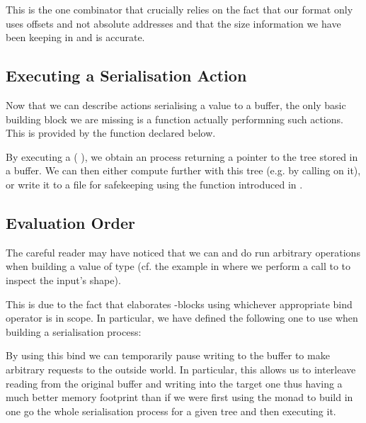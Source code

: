 This is the one combinator that crucially relies on the fact that our format
only uses offsets and not absolute addresses
and that the size information we have been keeping in  and
 is accurate.

\subsection{Executing a Serialisation Action}

Now that we can describe actions serialising a value to a buffer,
the only basic building block we are missing is a function actually
performning such actions.
%
This is provided by the  function
declared below.


By executing a (  ), we
obtain an  process returning a pointer to the tree 
stored in a buffer.
%
We can then either compute further with this tree (e.g. by calling
 on it), or write it to a file for safekeeping
using the function 
introduced in .

\subsection{Evaluation Order}

The careful reader may have noticed that we can and do run arbitrary 
operations when building a value of type 
(cf. the  example in  where we perform
a call to  to inspect the input's shape).

This is due to the fact that \idris{} elaborates -blocks using
whichever appropriate bind operator is in scope. In particular, we have defined
the following one to use when building a serialisation process:


By using this bind we can temporarily pause writing to the buffer to make
arbitrary  requests to the outside world.
%
In particular, this allows us to interleave reading from the original buffer
and writing into the target one thus having a much better memory footprint than
if we were first using the  monad to build in one go the whole
serialisation process for a given tree and then executing it.
